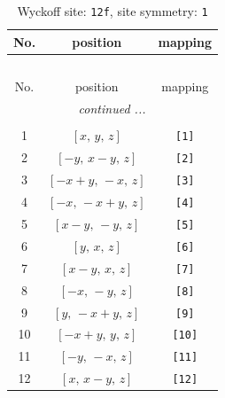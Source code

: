 \documentclass[fleqn,8pt]{jsarticle}
\begin{document}
\begin{longtable}{ccc}
\caption{Wyckoff site: {\tt 12f}, site symmetry: {\tt 1}}
 \\
 \hline \hline
No. & position & mapping \\ \hline \endfirsthead

\multicolumn{2}{l}{\tablename\ \thetable{}} \\
 \hline \hline
No. & position & mapping \\ \hline \endhead

 \hline \hline
\multicolumn{2}{r}{\footnotesize\it continued ...} \\ \endfoot

 \hline \hline
\multicolumn{2}{r}{} \\ \endlastfoot

1 & $\left[ x,\, y,\, z \right]$ & {\tt [1]} \\ \hline
2 & $\left[ - y,\, x - y,\, z \right]$ & {\tt [2]} \\ \hline
3 & $\left[ - x + y,\, - x,\, z \right]$ & {\tt [3]} \\ \hline
4 & $\left[ - x,\, - x + y,\, z \right]$ & {\tt [4]} \\ \hline
5 & $\left[ x - y,\, - y,\, z \right]$ & {\tt [5]} \\ \hline
6 & $\left[ y,\, x,\, z \right]$ & {\tt [6]} \\ \hline
7 & $\left[ x - y,\, x,\, z \right]$ & {\tt [7]} \\ \hline
8 & $\left[ - x,\, - y,\, z \right]$ & {\tt [8]} \\ \hline
9 & $\left[ y,\, - x + y,\, z \right]$ & {\tt [9]} \\ \hline
10 & $\left[ - x + y,\, y,\, z \right]$ & {\tt [10]} \\ \hline
11 & $\left[ - y,\, - x,\, z \right]$ & {\tt [11]} \\ \hline
12 & $\left[ x,\, x - y,\, z \right]$ & {\tt [12]} \\
\end{longtable}
\end{document}
